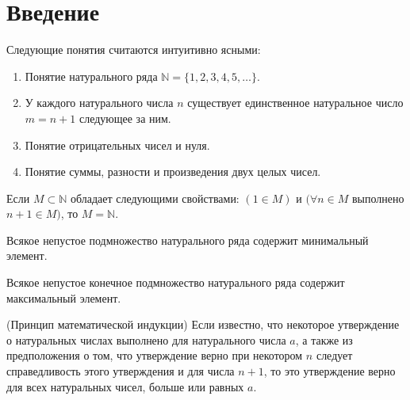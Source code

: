 \section*{Введение}
        Следующие понятия считаются интуитивно ясными:
    \begin{enumerate}
        \item Понятие натурального ряда $\mathbb{N} = \{1, 2, 3, 4, 5, \dots\}$.
        \item У каждого натурального числа $n$ существует единственное натуральное число $m=n+1$ следующее за ним. 
        \item Понятие отрицательных чисел и нуля.
        \item Понятие суммы, разности и произведения двух целых чисел.
    \end{enumerate}
    \begin{axiom}
        Если $M \subset \mathbb{N}$ обладает следующими свойствами: $(1 \in M)$ и $(\forall n\in M$ выполнено $n+1 \in M)$, то $M = \mathbb{N}$.
    \end{axiom}
    \begin{cons}
        Всякое непустое подмножество натурального ряда содержит минимальный элемент.
    \end{cons}
    \begin{cons}
        Всякое непустое конечное подмножество натурального ряда содержит максимальный элемент.
    \end{cons}
    \begin{cons} (Принцип математической индукции)\newline
        Если известно, что некоторое утверждение о натуральных числах выполнено для натурального числа $a$, а также из предположения о том, что утверждение верно при некотором $n$ следует справедливость этого утверждения и для числа $n+1$, то это утверждение верно для всех натуральных чисел, больше или равных $a$.
    \end{cons}

